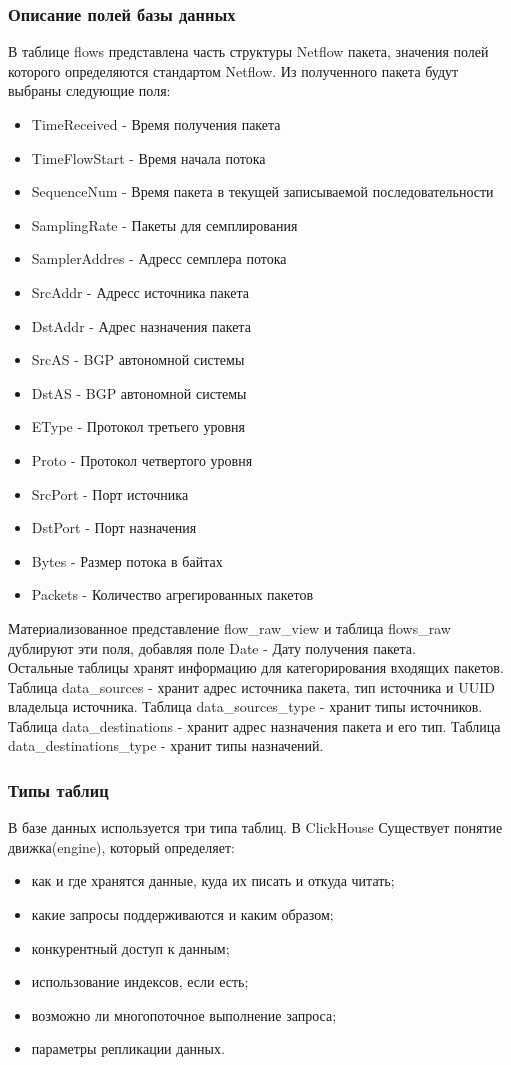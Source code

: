\subsubsection{Описание полей базы данных}
В таблице flows представлена часть структуры Netflow пакета, значения полей которого определяются стандартом Netflow. Из полученного пакета будут выбраны следующие поля:
\begin{itemize}
	\item TimeReceived - Время получения пакета
	\item TimeFlowStart - Время начала потока
	\item SequenceNum - Время пакета в текущей записываемой последовательности
	\item SamplingRate - Пакеты для семплирования
	\item SamplerAddres - Адресс семплера потока
	\item SrcAddr - Адресс источника пакета
	\item DstAddr - Адрес назначения пакета
	\item SrcAS - BGP автономной системы
	\item DstAS - BGP автономной системы	
	\item EType - Протокол третьего уровня
	\item Proto - Протокол четвертого уровня
	\item SrcPort - Порт источника
	\item DstPort - Порт назначения
	\item Bytes - Размер потока в байтах
	\item Packets - Количество агрегированных пакетов
\end{itemize}
\indent Материализованное представление flow\_raw\_view и таблица flows\_raw дублируют эти поля, добавляя поле Date - Дату получения пакета. \\
\indent Остальные таблицы хранят информацию для категорирования входящих пакетов. Таблица data\_sources - хранит адрес источника пакета, тип источника и UUID владельца источника. Таблица data\_sources\_type - хранит типы источников. Таблица data\_destinations - хранит адрес назначения пакета и его тип. Таблица data\_destinations\_type - хранит типы назначений.
\subsubsection{Типы таблиц}
В базе данных используется три типа таблиц.
В ClickHouse Существует понятие движка(engine), который определяет:
\begin{itemize}
\item как и где хранятся данные, куда их писать и откуда читать;
\item какие запросы поддерживаются и каким образом;
\item конкурентный доступ к данным;
\item использование индексов, если есть;
\item возможно ли многопоточное выполнение запроса;
\item параметры репликации данных.
\end{itemize}

